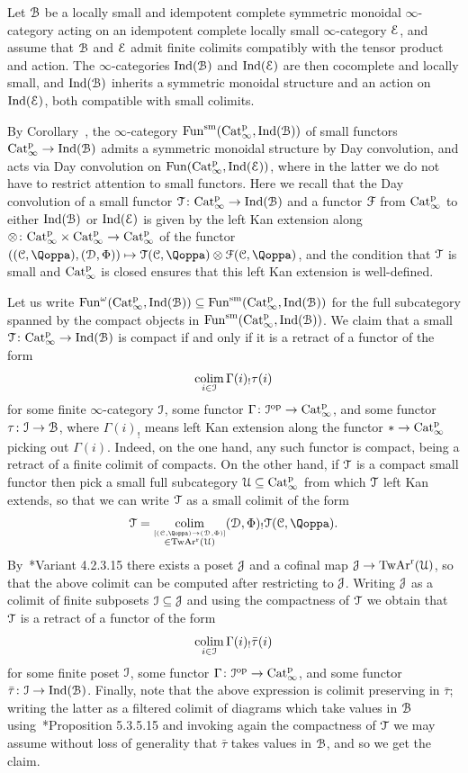 \begin{construction}
\label{const:day-conv}%
Let $\mathcal{B}$ be a locally small and idempotent complete symmetric monoidal $\infty$-category acting on an idempotent complete locally small $\infty$-category $\mathcal{E}$, and assume that $\mathcal{B}$ and $\mathcal{E}$ admit finite colimits compatibly with the tensor product and action. The $\infty$-categories $\operatorname{Ind}(\mathcal{B})$ and $\operatorname{Ind}(\mathcal{E})$ are then cocomplete and locally small, and $\operatorname{Ind}(\mathcal{B})$ inherits a symmetric monoidal structure and an action on $\operatorname{Ind}(\mathcal{E})$, both compatible with small colimits. 

By Corollary~, the $\infty$-category $\operatorname{Fun}^{\mathrm{sm}}(\mathrm{Cat}^{\mathrm p}_\infty,\operatorname{Ind}(\mathcal{B}))$ of small functors $\mathrm{Cat}^{\mathrm p}_\infty \to \operatorname{Ind}(\mathcal{B})$ admits a symmetric monoidal structure by Day convolution, and acts via Day convolution on $\operatorname{Fun}(\mathrm{Cat}^{\mathrm p}_\infty,\operatorname{Ind}(\mathcal{E}))$, where in the latter we do not have to restrict attention to small functors. Here we recall that the Day convolution of a small functor $\mathcal{T}\colon \mathrm{Cat}^{\mathrm p}_\infty \to \operatorname{Ind}(\mathcal{B})$ and a functor $\mathcal{F}$ from $\mathrm{Cat}^{\mathrm p}_\infty$ to either $\operatorname{Ind}(\mathcal{B})$ or $\operatorname{Ind}(\mathcal{E})$ is given by the left Kan extension along $\otimes\colon \mathrm{Cat}^{\mathrm p}_\infty \times \mathrm{Cat}^{\mathrm p}_\infty \to \mathrm{Cat}^{\mathrm p}_\infty$ of the functor $((\C,\QF),(\D,\QFD)) \mapsto \T(\C,\QF)\otimes \F(\C,\QF)$, and the condition that $\mathcal{T}$ is small and $\mathrm{Cat}^{\mathrm p}_\infty$ is closed ensures that this left Kan extension is well-defined.

Let us write $\operatorname{Fun}^{\omega}(\mathrm{Cat}^{\mathrm p}_\infty,\operatorname{Ind}(\mathcal{B})) \subseteq \operatorname{Fun}^{\mathrm{sm}}(\mathrm{Cat}^{\mathrm p}_\infty,\operatorname{Ind}(\mathcal{B}))$ for the full subcategory spanned by the compact objects in $\operatorname{Fun}^{\mathrm{sm}}(\mathrm{Cat}^{\mathrm p}_\infty,\operatorname{Ind}(\mathcal{B}))$. We claim that a small $\mathcal{T}\colon \mathrm{Cat}^{\mathrm p}_\infty \to \operatorname{Ind}(\mathcal{B})$ is compact if and only if it is a retract of a functor of the form
\[
\mathop{\mathrm{colim}}_{i \in \mathcal{I}}\Gamma(i)_!\tau(i) 
\]
for some finite $\infty$-category $\mathcal{I}$, some functor $\Gamma\colon \mathcal{I}^\mathrm{op} \to \mathrm{Cat}^{\mathrm p}_\infty$, and some functor $\tau\colon \mathcal{I} \to \mathcal{B}$, where $\Gamma(i)_!$ means left Kan extension along the functor $\ast \to \mathrm{Cat}^{\mathrm p}_\infty$ picking out $\Gamma(i)$. 
Indeed, on the one hand, any such functor is compact, being a retract of a finite colimit of compacts. On the other hand, if $\mathcal{T}$ is a compact small functor then pick a %
small full subcategory $\mathcal{U} \subseteq \mathrm{Cat}^{\mathrm p}_\infty$ from which $\mathcal{T}$ left Kan extends, so that we can write $\mathcal{T}$ as a small colimit of the form
\[
\T = \colim_{\stackrel{[(\C,\QF) \to (\D,\QFD)]}{\in \Twar(\mathcal{U})}}(\D,\QFD)_!\T(\C,\QF) .
\]
By~\cite{HTT}*{Variant 4.2.3.15} there exists a poset $\mathcal{J}$ and a cofinal map $\mathcal{J} \to \operatorname{TwAr}^{\mathrm{r}}(\mathcal{U})$, so that the above colimit can be computed after restricting to $\mathcal{J}$. %
Writing $\mathcal{J}$ as a colimit of finite subposets $\mathcal{I} \subseteq \mathcal{J}$ and using the compactness of $\mathcal{T}$ we obtain that
$\mathcal{T}$ is a retract of a functor of the form 
\[
\mathop{\mathrm{colim}}_{i \in \mathcal{I}}\Gamma(i)_!\bar{\tau}(i)
\]
for some finite poset $\mathcal{I}$, some functor $\Gamma\colon \mathcal{I}^\mathrm{op} \to \mathrm{Cat}^{\mathrm p}_\infty$, and some functor $\bar{\tau}\colon \mathcal{I} \to \operatorname{Ind}(\mathcal{B})$. Finally, note that the above expression is colimit preserving in $\bar{\tau}$; writing the latter as a filtered colimit of diagrams which take values in $\mathcal{B}$ using~\cite{HTT}*{Proposition 5.3.5.15} %
and invoking again the compactness of $\mathcal{T}$ we may assume without loss of generality that $\bar{\tau}$ takes values in $\mathcal{B}$, and so we get the claim.


\end{construction}
